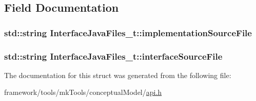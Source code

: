 \subsection{Field Documentation}
\subsubsection[{\texorpdfstring{implementation\+Source\+File}{implementationSourceFile}}]{\setlength{\rightskip}{0pt plus 5cm}std\+::string Interface\+Java\+Files\+\_\+t\+::implementation\+Source\+File}\hypertarget{struct_interface_java_files__t_a882976a1e6bc9e4543ad40c7d32e4922}{}\label{struct_interface_java_files__t_a882976a1e6bc9e4543ad40c7d32e4922}
\subsubsection[{\texorpdfstring{interface\+Source\+File}{interfaceSourceFile}}]{\setlength{\rightskip}{0pt plus 5cm}std\+::string Interface\+Java\+Files\+\_\+t\+::interface\+Source\+File}\hypertarget{struct_interface_java_files__t_ab2a6e18fa1ef213399872c6367d37f0b}{}\label{struct_interface_java_files__t_ab2a6e18fa1ef213399872c6367d37f0b}


The documentation for this struct was generated from the following file\+:\begin{DoxyCompactItemize}
\item 
framework/tools/mk\+Tools/conceptual\+Model/\hyperlink{api_8h}{api.\+h}\end{DoxyCompactItemize}
